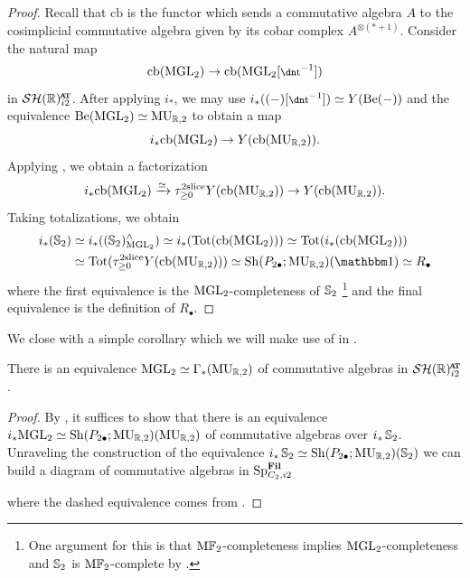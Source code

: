 \begin{proof}
  Recall that $\mathrm{cb}$ is the functor which sends a commutative algebra $A$ to the cosimplicial commutative algebra given by its cobar complex $A^{\otimes(\ast+1)}$. Consider the natural map
  \[ \mathrm{cb}(\MGL_2) \to \mathrm{cb}(\MGL_2[\ta^{-1}]) \]
  in $\SHRat$. After applying $i_*$, we may use $i_*((-)[\ta^{-1}]) \simeq Y(\b (-))$ and the equivalence $\mathrm{Be} (\mathrm{MGL}_2) \simeq \operatorname{\mathrm{MU}}_{\mathbb{R},2}$ to obtain a map
  \[ i_*\mathrm{cb}(\mathrm{MGL}_2) \to Y(\mathrm{cb}(\operatorname{\mathrm{MU}}_{\mathbb{R},2})). \]
  Applying , we obtain a factorization
  \[ i_*\mathrm{cb}(\mathrm{MGL}_2) \xrightarrow{\simeq} \tau_{\geq 0}^{2\mathrm{slice}} Y(\mathrm{cb}(\operatorname{\mathrm{MU}}_{\mathbb{R},2})) \to Y(\mathrm{cb}(\operatorname{\mathrm{MU}}_{\mathbb{R},2})). \]
  Taking totalizations, we obtain
  \begin{align*}
    i_*(\Ss_2)
    &\simeq i_*((\Ss_2)_{\MGL_2}^{\wedge})
    \simeq i_* (\mathrm{Tot}( \mathrm{cb}(\MGL_2)) )
    \simeq \mathrm{Tot}( i_* (\mathrm{cb}(\MGL_2)) ) \\
    &\simeq \mathrm{Tot}( \tau_{\geq 0}^{2\mathrm{slice}} Y(\mathrm{cb}(\MU_{\R,2})))
    \simeq \mathrm{Sh}(P_{2\bullet} ; \MU_{\R,2})(\o)
    \simeq R_\bullet 
  \end{align*} 
  where the first equivalence is the $\mathrm{MGL}_2$-completeness of $\operatorname{\mathbb{S}}_2$ \footnote{One argument for this is that $\mathrm{M}\mathbb{F}_2$-completeness implies $\mathrm{MGL}_2$-completeness and $\operatorname{\mathbb{S}}_2$ is $\mathrm{M}\mathbb{F}_2$-complete by \cite{MAdamsConv}.} and the final equivalence is the definition of $R_\bullet$.
\end{proof}

We close with a simple corollary which we will make use of in .

\begin{cor} \label{cor:gamma-MGL}
  There is an equivalence $\mathrm{MGL}_2 \simeq \Gamma_*(\operatorname{\mathrm{MU}}_{\mathbb{R},2})$ of commutative algebras in $\SHRat$.
\end{cor}

\begin{proof}
  By , it suffices to show that there is an equivalence $i_* \mathrm{MGL}_2 \simeq \mathrm{Sh}(P_{2\bullet} ; \operatorname{\mathrm{MU}}_{\mathbb{R},2}) (\operatorname{\mathrm{MU}}_{\mathbb{R},2})$ of commutative algebras over $i_* \operatorname{\mathbb{S}}_2$.
  Unraveling the construction of the equivalence $i_*\operatorname{\mathbb{S}}_2 \simeq \mathrm{Sh}(P_{2\bullet} ; \operatorname{\mathrm{MU}}_{\mathbb{R},2}) (\operatorname{\mathbb{S}}_2)$ we can build a diagram of commutative algebras in $\operatorname{\mathrm{Sp}}_{C_2, i2} ^{\operatorname{\mathbf{Fil}}}$
  \begin{center}  \end{center}
  where the dashed equivalence comes from .
\end{proof}



